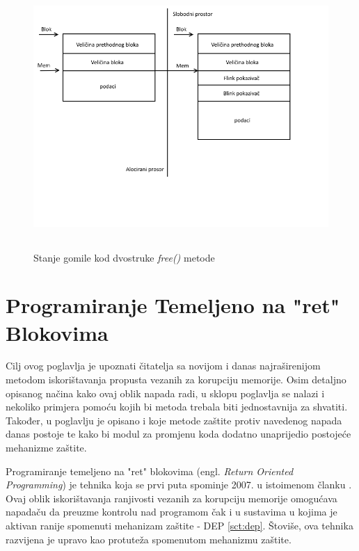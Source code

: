 \documentclass[times, utf8, diplomski, numeric]{fer}
\begin{document}
\begin{figure}[!ht]
\centering
\setlength\fboxsep{0pt}
\setlength\fboxrule{0.5pt}
\includegraphics[width=15cm, height=10cm]{slike/double_free}
\caption{Stanje gomile kod dvostruke \emph{free()} metode}
\label{fig:double_free} 
\end{figure}

\pagebreak
 
\section{Programiranje Temeljeno na "ret" Blokovima}
\label{sct:rop}

Cilj ovog poglavlja je upoznati čitatelja sa novijom i danas
najraširenijom metodom iskorištavanja propusta vezanih za
korupciju memorije. Osim detaljno opisanog načina kako ovaj oblik
napada radi, u sklopu poglavlja se nalazi i nekoliko primjera
pomoću kojih bi metoda trebala biti jednostavnija za shvatiti.
Također, u poglavlju je opisano i koje metode zaštite protiv
navedenog napada danas postoje te kako bi modul za promjenu koda
dodatno unaprijedio postojeće mehanizme zaštite.

Programiranje temeljeno na "ret" blokovima (engl. \emph{Return
Oriented Programming}) je tehnika koja se prvi puta spominje
2007. u istoimenom članku \citep{rop_official}. Ovaj oblik
iskorištavanja ranjivosti vezanih za korupciju memorije omogućava
napadaču da preuzme kontrolu nad programom čak i u sustavima u
kojima je aktivan ranije spomenuti mehanizam zaštite - DEP
\ref{sct:dep}. Štoviše, ova tehnika razvijena je upravo kao
protuteža spomenutom mehanizmu zaštite.
\end{document}
